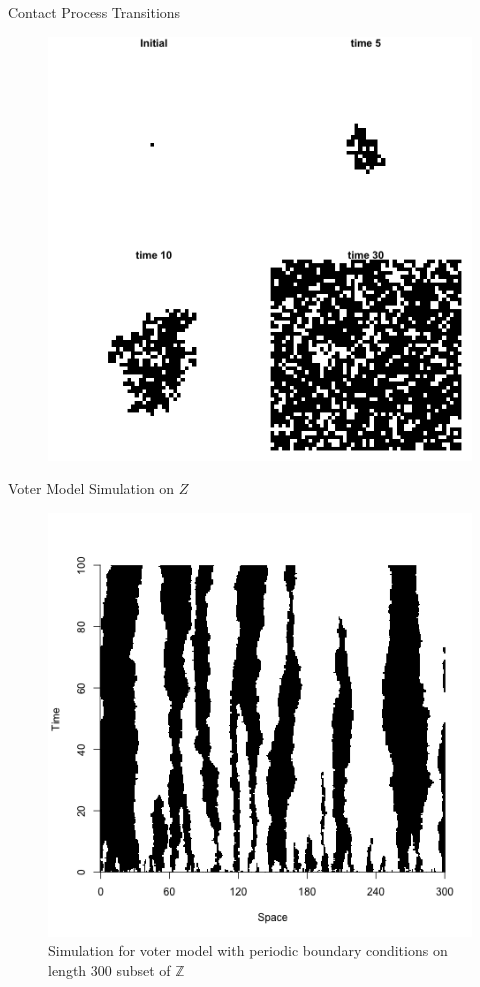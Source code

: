 \documentclass{beamer}
\theoremstyle{definition}
\newcommand{\Z}{\mathbb{Z}}
\begin{document}
\begin{frame}{Contact Process Transitions}
    \begin{figure}[H]
  \centering
    \includegraphics[width=.65\textwidth]{figures/contact_simulation_torus_25.png}
\end{figure}
\end{frame}

\begin{frame}{Voter Model Simulation on $Z$}
\begin{figure}[H]
  \centering
    \includegraphics[width=.6\textwidth]{figures/voter_simulation_1d_300.png}
   \caption{Simulation for voter model with periodic boundary conditions on length 300 subset of $\Z$}
  \label{fig:voter_sim_1d_torus.png}
\end{figure}
\end{frame}
\end{document}
